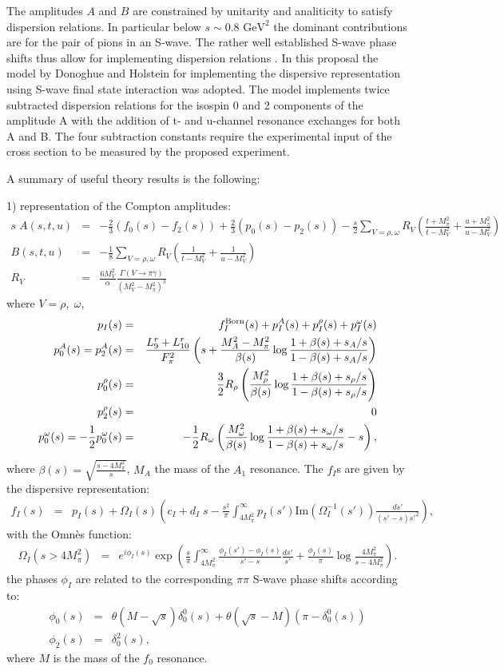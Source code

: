 \documentclass[12pt,epsfig]{article}
\newcommand{\bea}{\begin{eqnarray}}
\newcommand{\eea}{\end{eqnarray}}
\begin{document}
The amplitudes $A$ and $B$ are constrained by unitarity and analiticity to satisfy dispersion relations. In particular below $s\sim 0.8\text{ GeV}^2$ the dominant contributions are for the pair of pions in an S-wave. The rather well established S-wave phase shifts thus allow for implementing  dispersion relations \cite{Donoghue others}.  In this proposal the model by Donoghue and Holstein \cite{Donoghue} for implementing the dispersive representation using S-wave final state interaction was adopted. The model implements   twice subtracted dispersion relations for the isospin 0 and 2 components of the  amplitude A with the addition of t- and u-channel resonance exchanges for both A and B. The four subtraction constants require the experimental input of the cross section to be measured by the proposed experiment. 

A summary of useful  theory results is the following:  

1) representation of the Compton amplitudes:
\bea
s\;A(s,t,u)&=& -\frac 23(f_0(s)-f_2(s))+\frac 23 (p_0(s)-p_2(s))-\frac s 2\sum_{V=\rho,\omega} R_V (\frac{t+M_\pi^2}{t-M_V^2}+\frac{u+M_\pi^2}{u-M_V^2})\nonumber\\
B(s,t,u)&=&-\frac 18 \sum_{V=\rho,\omega} R_V (\frac{1}{t-M_V^2}+\frac{1}{u-M_V^2})\nonumber\\
R_V&=&\frac{6 M_V^2}{\alpha} \frac{\Gamma(V\to \pi \gamma)}{(M_V^2-M_\pi^2)^3}
\eea
where $V=\rho,\;\omega$, 
\bea
p_I(s)&=& f_I^{\rm Born}(s)+p_I^A(s)+p^\rho_I(s)+p_I^\omega(s)\nonumber\\
p_0^A(s)=p_2^A(s)&=&\frac{L_9^r+L_{10}^r}{F_\pi^2}\left(s+\frac{M_A^2-M_\pi^2}{\beta(s)}\log\frac{1+\beta(s)+s_A/s}{1-\beta(s)+s_A/s}\right)\nonumber\\
p_0^\rho(s)&=&\frac 32 R_\rho\left( \frac{M_\rho^2}{\beta(s)}  \log\frac{1+\beta(s)+s_\rho/s}{1-\beta(s)+s_\rho/s}\right)\nonumber\\
p_2^\rho(s)&=&0\nonumber\\
p_0^\omega(s)=-\frac 12 p_0^\omega(s)&=&-\frac 12 R_\omega\left( \frac{M_\omega^2}{\beta(s)}  \log\frac{1+\beta(s)+s_\omega/s}{1-\beta(s)+s_\omega/s}-s\right),
\eea
where $\beta(s)=\sqrt{\frac{s-4 M_\pi^2}{s}}$, $M_A$ the mass of the $A_1$ resonance. The $f_I$s are given by the dispersive representation:
\bea
f_I(s)&=& p_I(s)+\Omega_I(s)\left(c_I+d_I\;s-\frac{s^2}{\pi} \int_{4M_\pi^2}^\infty p_I(s') \text{Im}(\Omega_I^{-1}(s'))\frac {ds'} {(s'-s) s'^2}\right),
\eea
with the Omn\`es function:
\bea\Omega_I(s>4 M_\pi^2)&=&e^{i\phi_I(s)} \exp\left(\frac s\pi\int_{4 M_\pi^2}^\infty \frac{\phi_I(s')-\phi_I(s)}{s'-s} \frac{ds'}{s'}+\frac{\phi_I(s)}{\pi}\log\frac{4M_\pi^2}{s-4M_\pi^2}\right).
\eea
the phases $\phi_I$ are related to the corresponding $\pi\pi$ S-wave phase shifts according to:
\bea
\phi_0(s)&=&\theta(M-\sqrt{s}) \delta_0^0(s)+\theta( \sqrt{s}-M)(\pi-\delta_0^0(s))\nonumber\\
\phi_2(s)&=&\delta_0^2(s),
\eea
where $M$ is the mass of the $f_0$ resonance.  
\end{document}
